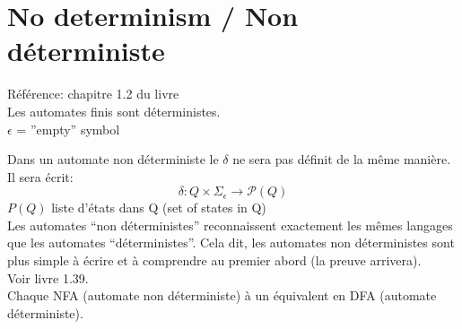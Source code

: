 \documentclass[a4paper,12pt]{article}
\begin{document}
\section{No determinism / Non déterministe}
  Référence: chapitre 1.2 du livre\\
  Les automates finis sont déterministes.\\
  $\epsilon$ = ''empty'' symbol


  Dans un automate non déterministe le $\delta$ ne sera pas définit de la même manière.  Il sera écrit:
  $$\delta : Q \times \Sigma_{\epsilon} \rightarrow \mathcal P(Q)$$
  $P(Q)$ liste d'états dans Q (set of states in Q)\\
  Les automates ``non déterministes'' reconnaissent exactement les mêmes langages que les automates ``déterministes''.  Cela dit, les automates non déterministes sont plus simple à écrire et à comprendre au premier abord (la preuve arrivera).\\
  Voir livre 1.39.\\
  Chaque NFA (automate non déterministe) à un équivalent en DFA (automate déterministe).
\end{document}

